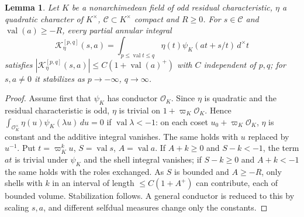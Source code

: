 \documentclass[11pt,oneside,notitlepage]{book}
\numberwithin{equation}{section}
\theoremstyle{plain}
\newtheorem{lemma}[theorem]{Lemma}
\theoremstyle{definition}
\newcommand{\cO}{\mathcal{O}}
\newcommand{\val}{\operatorname{val}}
\begin{document}
\begin{lemma}\label{lem:shell}
Let $K$ be a nonarchimedean field of odd residual characteristic, $\eta$ a quadratic character of $K^\times$, $\mathcal C\subset K^\times$ compact and $R\ge0$. For $s\in\mathcal C$ and $\val(a)\ge-R$, every partial annular integral
\[\mathcal K_\eta^{[p,q]}(s,a)=\int_{p\le\val t\le q}\eta(t)\psi_K(at+s/t)\,d^\times t\]
satisfies $|\mathcal K_\eta^{[p,q]}(s,a)|\le C(1+\val(a)^+)$ with $C$ independent of $p,q$; for $s,a\ne0$ it stabilizes as $p\to-\infty$, $q\to\infty$.
\end{lemma}
\begin{proof}
Assume first that $\psi_K$ has conductor $\cO_K$. Since $\eta$ is quadratic and the residual characteristic is odd, $\eta$ is trivial on $1+\varpi_K\cO_K$. Hence $\int_{\cO_K^\times}\eta(u)\psi_K(\lambda u)\,du=0$ if $\val\lambda<-1$: on each coset $u_0+\varpi_K\cO_K$, $\eta$ is constant and the additive integral vanishes. The same holds with $u$ replaced by $u^{-1}$. Put $t=\varpi_K^ku$, $S=\val s$, $A=\val a$. If $A+k\ge0$ and $S-k<-1$, the term $at$ is trivial under $\psi_K$ and the shell integral vanishes; if $S-k\ge0$ and $A+k<-1$ the same holds with the roles exchanged. As $S$ is bounded and $A\ge-R$, only shells with $k$ in an interval of length $\le C(1+A^+)$ can contribute, each of bounded volume. Stabilization follows. A general conductor is reduced to this by scaling $s,a$, and different selfdual measures change only the constants.
\end{proof}
\end{document}
